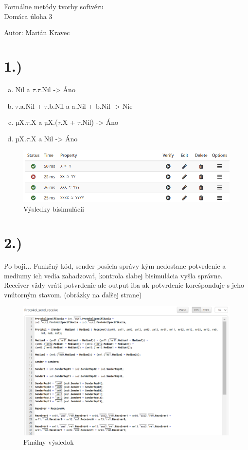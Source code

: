 \documentclass[a4paper]{article}
\begin{document}
 
	
\pagestyle{plain}

\begin{center}
	\sc\large
	Formálne metódy tvorby softvéru\\
	Domáca úloha 3
\end{center}

Autor: Marián Kravec

\section{1.)}

\begin{enumerate}[a)]
	\item Nil a $\tau$.$\tau$.Nil  ->  Áno
	\item $\tau$.a.Nil + $\tau$.b.Nil a a.Nil + b.Nil  -> Nie
	\item µX.$\tau$.X a µX.($\tau$.X + $\tau$.Nil) -> Áno
	\item µX.$\tau$.X a Nil  -> Áno
\end{enumerate}

\begin{figure}[!h]
	\centering
	\includegraphics[width=1\textwidth]{bisim.png}
	\caption{Výsledky bisimulácii}
\end{figure}

\section{2.)}
Po boji... Funkčný kód, sender posiela správy kým nedostane potvrdenie a mediumy ich vedia zahadzovať, kontrola slabej bisimulácia vyšla správne. Receiver vždy vráti potvrdenie ale output iba ak potvrdenie korešponduje s jeho vnútorným stavom. (obrázky na ďalšej strane)

\begin{figure}[!h]
	\centering
	\includegraphics[width=1\textwidth]{protokol.png}
	\caption{Finálny výsledok}
\end{figure}
\end{document}
